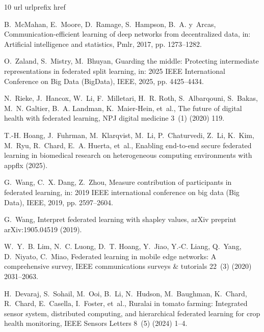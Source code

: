 \documentclass[preprint,12pt, a4paper]{elsarticle}
\begin{document}
\begin{thebibliography}{10}
\expandafter\ifx\csname url\endcsname\relax
  \def\url#1{\texttt{#1}}\fi
\expandafter\ifx\csname urlprefix\endcsname\relax\def\urlprefix{URL }\fi
\expandafter\ifx\csname href\endcsname\relax
  \def\href#1#2{#2} \def\path#1{#1}\fi

B.~McMahan, E.~Moore, D.~Ramage, S.~Hampson, B.~A. y~Arcas, Communication-efficient learning of deep networks from decentralized data, in: Artificial intelligence and statistics, Pmlr, 2017, pp. 1273--1282.

O.~Zaland, S.~Mistry, M.~Bhuyan, Guarding the middle: Protecting intermediate representations in federated split learning, in: 2025 IEEE International Conference on Big Data (BigData), IEEE, 2025, pp. 4425--4434.

N.~Rieke, J.~Hancox, W.~Li, F.~Milletari, H.~R. Roth, S.~Albarqouni, S.~Bakas, M.~N. Galtier, B.~A. Landman, K.~Maier-Hein, et~al., The future of digital health with federated learning, NPJ digital medicine 3~(1) (2020) 119.

T.-H. Hoang, J.~Fuhrman, M.~Klarqvist, M.~Li, P.~Chaturvedi, Z.~Li, K.~Kim, M.~Ryu, R.~Chard, E.~A. Huerta, et~al., Enabling end-to-end secure federated learning in biomedical research on heterogeneous computing environments with appflx (2025).

G.~Wang, C.~X. Dang, Z.~Zhou, Measure contribution of participants in federated learning, in: 2019 IEEE international conference on big data (Big Data), IEEE, 2019, pp. 2597--2604.

G.~Wang, Interpret federated learning with shapley values, arXiv preprint arXiv:1905.04519 (2019).

W.~Y.~B. Lim, N.~C. Luong, D.~T. Hoang, Y.~Jiao, Y.-C. Liang, Q.~Yang, D.~Niyato, C.~Miao, Federated learning in mobile edge networks: A comprehensive survey, IEEE communications surveys \& tutorials 22~(3) (2020) 2031--2063.

H.~Devaraj, S.~Sohail, M.~Ooi, B.~Li, N.~Hudson, M.~Baughman, K.~Chard, R.~Chard, E.~Casella, I.~Foster, et~al., Ruralai in tomato farming: Integrated sensor system, distributed computing, and hierarchical federated learning for crop health monitoring, IEEE Sensors Letters 8~(5) (2024) 1--4.


\end{thebibliography}
\end{document}

